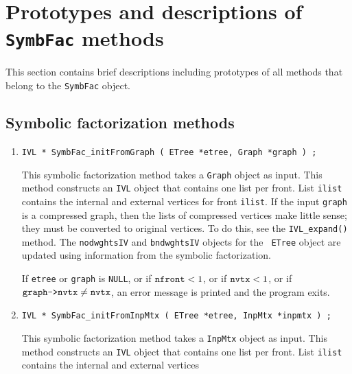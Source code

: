 \par
\section{Prototypes and descriptions of {\tt SymbFac} methods}
\label{subsection:SymbFac:proto}
\par
This section contains brief descriptions including prototypes
of all methods that belong to the {\tt SymbFac} object.
\par
\subsection{Symbolic factorization methods}
\label{subsection:SymbFac:proto:symbfac}
\par
\begin{enumerate}
\item
\begin{verbatim}
IVL * SymbFac_initFromGraph ( ETree *etree, Graph *graph ) ;
\end{verbatim}
This symbolic factorization method takes a {\tt Graph} object
as input.
This method constructs an {\tt IVL} object that contains one list
per front. 
List {\tt ilist} contains the internal and external vertices
for front {\tt ilist}.
If the input {\tt graph} is a compressed graph, then the lists of
compressed vertices make little sense; they must be converted to
original vertices.
To do this, see the {\tt IVL\_expand()} method.
The {\tt nodwghtsIV} and {\tt bndwghtsIV} objects for the {\tt
ETree} object are updated using information from the symbolic
factorization.
\par {}
If {\tt etree} or {\tt graph} is {\tt NULL},
or if ${\tt nfront} < 1$,
or if ${\tt nvtx} < 1$,
or if $\mbox{\tt graph->nvtx} \ne {\tt nvtx}$,
an error message is printed and the program exits.
\item
\begin{verbatim}
IVL * SymbFac_initFromInpMtx ( ETree *etree, InpMtx *inpmtx ) ;
\end{verbatim}
This symbolic factorization method takes a {\tt InpMtx} object
as input.
This method constructs an {\tt IVL} object that contains one list
per front. 
List {\tt ilist} contains the internal and external vertices

\end{enumerate}
